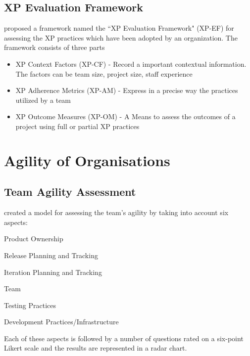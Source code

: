 
\subsection{XP Evaluation Framework} %
\citet{williams2004toward} proposed a framework named the ``XP Evaluation Framework" (XP-EF) for assessing the XP practices which have been adopted by an organization. The framework consists of three parts
\begin{itemize}
\item XP Context Factors (XP-CF) - Record a important contextual information. The factors can be team size, project size, staff experience
\item XP Adherence Metrics (XP-AM) - Express in a precise way the practices utilized by a team
\item XP Outcome Measures (XP-OM) - A Means to assess the outcomes of a project using full or partial XP practices
\end{itemize}

\section{Agility of Organisations}

\subsection{Team Agility Assessment} %
\citet{Leffingwell} created a model for assessing the team's agility by taking into account six aspects: 
\begin{inparaenum} [a\upshape)]
\item Product Ownership
\item Release Planning and Tracking
\item Iteration Planning and Tracking
\item Team
\item Testing Practices
\item Development Practices/Infrastructure
\end{inparaenum}

Each of these aspects is followed by a number of questions rated on a six-point Likert scale and the results are represented in a radar chart.

